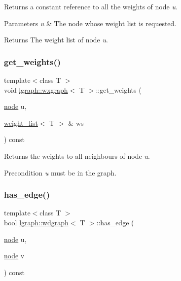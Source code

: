 Returns a constant reference to all the weights of node {\itshape u}. 


\begin{DoxyParams}{Parameters}
{\em u} & The node whose weight list is requested. \\
\hline
\end{DoxyParams}
\begin{DoxyReturn}{Returns}
The weight list of node {\itshape u}. 
\end{DoxyReturn}
\mbox{\label{classlgraph_1_1wxgraph_a423a6e9eb99fd40d9aae73e7ff5adca9}} 
\subsubsection{\texorpdfstring{get\+\_\+weights()}{get\_weights()}\hspace{0.1cm}{\footnotesize\ttfamily [2/2]}}
{\footnotesize\ttfamily template$<$class T $>$ \\
void \hyperlink{classlgraph_1_1wxgraph}{lgraph\+::wxgraph}$<$ T $>$\+::get\+\_\+weights (\begin{DoxyParamCaption}\item[{\hyperlink{namespacelgraph_a397169dd66adf725210a30fb7251773e}{node}}]{u,  }\item[{\hyperlink{namespacelgraph_a1e0fd5ef0a78b2a92da48adbed265cb6}{weight\+\_\+list}$<$ T $>$ \&}]{ws }\end{DoxyParamCaption}) const\hspace{0.3cm}{\ttfamily [inherited]}}



Returns the weights to all neighbours of node {\itshape u}. 

\begin{DoxyPrecond}{Precondition}
{\itshape u} must be in the graph. 
\end{DoxyPrecond}
\mbox{\label{classlgraph_1_1wdgraph_a0b0f9b2cec5dbdd7eb84305c588e31c1}} 
\subsubsection{\texorpdfstring{has\+\_\+edge()}{has\_edge()}}
{\footnotesize\ttfamily template$<$class T $>$ \\
bool \hyperlink{classlgraph_1_1wdgraph}{lgraph\+::wdgraph}$<$ T $>$\+::has\+\_\+edge (\begin{DoxyParamCaption}\item[{\hyperlink{namespacelgraph_a397169dd66adf725210a30fb7251773e}{node}}]{u,  }\item[{\hyperlink{namespacelgraph_a397169dd66adf725210a30fb7251773e}{node}}]{v }\end{DoxyParamCaption}) const\hspace{0.3cm}{\ttfamily [virtual]}}



